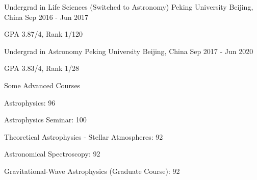 


\begin{cventries}


\cventry
{Undergrad in Life Sciences (Switched to Astronomy)} %
{Peking University} %
{Beijing, China} %
{Sep 2016 - Jun 2017} %
{ %
	\begin{cvitems}
		\item {GPA 3.87/4, Rank 1/120}
	\end{cvitems}
}

\cventry
{Undergrad in Astronomy} %
{Peking University} %
{Beijing, China} %
{Sep 2017 - Jun 2020} %
{ %
	\begin{cvitems}
		\item {GPA 3.83/4, Rank 1/28}
	\end{cvitems}
}

\cventry
{Some Advanced Courses} %
{} %
{} %
{} %
{ %
	\begin{cvitems}
		\item {Astrophysics: 96}
		\item {Astrophysics Seminar: 100}
		\item {Theoretical Astrophysics - Stellar Atmospheres: 92}
		\item {Astronomical Spectroscopy: 92}
		\item {Gravitational-Wave Astrophysics (Graduate Course): 92}
	\end{cvitems}
}



\end{cventries}